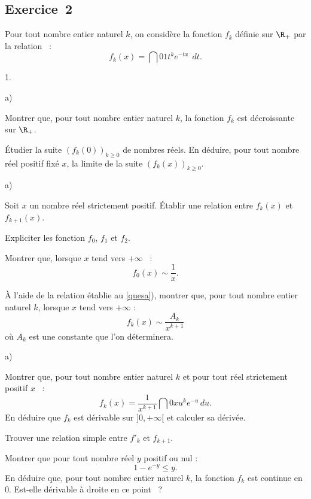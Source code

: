 \documentclass[11pt]{article}%
\begin{document}
\subsection*{Exercice~2}
Pour tout nombre entier naturel $k$, on considère la fonction $f_{k}$
définie sur $\R_+ $
par la relation~ :
\[
f_{k}(x) = \dint{0}{1} t^{k} e^{-tx} \ \ dt.
\]
\begin{noliste}{1.}
 \setlength{\itemsep}{4mm}
 \item 
\begin{noliste}{a)}
 \setlength{\itemsep}{2mm}
 \item Montrer que, pour tout nombre entier naturel $k$, la fonction
$f_{k}$ est décroissante sur $\R_+ $. 
\item Étudier la suite $\left( f_{k}(0) \right)_{k \geq 0} $ de nombres
réels.
En déduire, pour tout nombre réel positif fixé $x$, la limite de la
suite 
$\left( f_{k}(x) \right)_{k \geq 0}$.
\end{noliste}
\item 
\begin{noliste}{a)}
 \setlength{\itemsep}{2mm}
\item \label{quesa} Soit $x$ un nombre réel strictement positif.
Établir une relation
entre $f_{k}(x)$ et $f_{k + 1} (x)$.
\item Expliciter les fonction $f_{0}$, $f_{1}$ et $f_{2}$.
\item Montrer que, lorsque $x$ tend vers $ + \infty$~ : 
\[
f_{0} (x) \sim \frac{1}{x}.
\]
\item À l'aide de la relation établie au \ref{quesa}), montrer que, 
pour tout nombre entier naturel $k$, lorsque $x$ tend vers
$ + \infty$ :
\[
f_{k} (x) \sim \frac{A_{k}}{x^{k + 1}}
\]
où $A_{k}$ est une constante que l'on déterminera.
\end{noliste}
\item 
\begin{noliste}{a)}
 \setlength{\itemsep}{2mm}
 \item Montrer que, pour tout nombre entier naturel $k$ et
pour tout réel strictement positif $x$~ :
\[
f_{k}(x) = \frac{1}{x^{k + 1}}\dint{0}{x} u^{k} e^{-u} \, du.
\]
En déduire que $f_{k}$ est dérivable sur $]0, + \infty[$ et calculer sa
dérivée.
\item Trouver une relation simple entre $f'_{k}$ et $f_{k + 1}$.
\end{noliste}
\item Montrer que pour tout nombre réel $y$ positif ou nul : 
\[
1 - e^{-y} \leq y.
\]
En déduire que, pour tout nombre entier naturel $k$, la fonction
$f_{k}$ est continue en $0$.
Est-elle dérivable à droite en ce point~ ?
\end{noliste}
\end{document}
